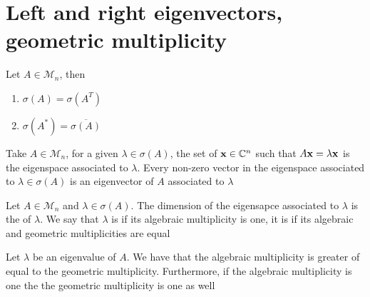 \documentclass[aspectratio=169]{beamer}
\begin{document}
\section{Left and right eigenvectors, geometric multiplicity}

\begin{frame}
\begin{theorem}
Let $A\in \mathcal{M}_n$, then 
\begin{enumerate}
\item $\sigma(A)= \sigma(A^T)$
\item $\sigma(A^{*})= \overline{\sigma(A)}$
\end{enumerate}
\end{theorem}
\vfill
\begin{definition}
Take $A\in \mathcal{M}_n$, for a given $\lambda\in \sigma(A)$, the set of $\mathbf{x}\in \mathbb{C}^n$ such that $A\mathbf{x}=\lambda\mathbf{x}$ is the eigenspace associated to $\lambda$. Every non-zero vector in the eigenspace associated to $\lambda\in \sigma(A)$ is an eigenvector of $A$ associated to $\lambda$
\end{definition}
\end{frame}


\begin{frame}
\begin{definition}
Let $A\in \mathcal{M}_n$ and $\lambda \in \sigma(A)$. The dimension of the eigensapce associated to $\lambda$ is the  of $\lambda$. We say that $\lambda$ is  if its algebraic multiplicity is one, it is  if its algebraic and geometric multiplicities are equal
\end{definition}
\vfill
\begin{proposition}
Let $\lambda$ be an eigenvalue of $A$. We have that the algebraic multiplicity is greater of equal to the geometric multiplicity. Furthermore, if the algebraic multiplicity is one the the geometric multiplicity is one as well
\end{proposition}
\end{frame}
\end{document}
